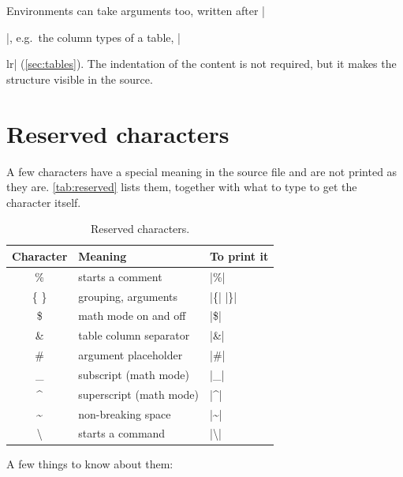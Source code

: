 Environments can take arguments too, written after \code|\begin{...}|,
e.g.\ the column types of a table, \code|\begin{tabular}{lr}| (\autoref{sec:tables}).
The indentation of the content is not required, but it makes the structure visible in the source.

\section{Reserved characters}\label{sec:reserved}

A few characters have a special meaning in the source file and are not printed as they are.
\autoref{tab:reserved} lists them, together with what to type to get the character itself.

\begin{table}[htbp]
    \centering
    \caption{Reserved characters.}
    \label{tab:reserved}
    \renewcommand{\arraystretch}{1.2}
    \begin{tabular}{@{}>{\ttfamily}c l l@{}}
        \toprule
        \textnormal{\textbf{Character}} & \textbf{Meaning} & \textbf{To print it} \\
        \midrule
        \%                  & starts a comment             & \code|\%| \\
        \{ \}               & grouping, arguments          & \code|\{| \code|\}| \\
        \$                  & math mode on and off         & \code|\$| \\
        \&                  & table column separator       & \code|\&| \\
        \#                  & argument placeholder         & \code|\#| \\
        \_                  & subscript (math mode)        & \code|\_| \\
        \^{}                & superscript (math mode)      & \code|\^{}| \\
        \textasciitilde     & non-breaking space           & \code|\textasciitilde| \\
        \textbackslash      & starts a command             & \code|\textbackslash| \\
        \bottomrule
    \end{tabular}
\end{table}

A few things to know about them:


\end{tabular}
\end{...}
